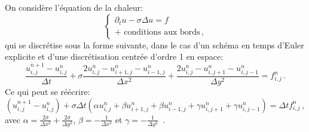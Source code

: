 \documentclass[11pt]{article}
\begin{document}
On considère l'équation de la chaleur: 
\begin{equation}
	\left\{
	\begin{array}{l}
		\partial_t u - \sigma \Delta u = f\\
		\textrm{+ conditions aux bords} \,,	
	\end{array}
	\right.
\label{eq:heat}
\end{equation}
qui se discrétise sous la forme suivante, dans le cas d'un schéma en temps d'Euler explicite et d'une discrétisation centrée d'ordre 1 en espace:
\begin{equation}
  \frac{u^{n+1}_{i,j}-u^{n}_{i,j}}{\Delta t} + \sigma \frac{2u^{n}_{i,j}-u^{n}_{i+1,j}-u^{n}_{i-1,j}}{\Delta x^2} + \frac{2u^{n}_{i,j} - u^{n}_{i,j+1} - u^{n}_{i,j-1}}{\Delta y^2} = f^{n}_{i,j} \,.
\label{eq:discrete}
\end{equation}
Ce qui peut se réécrire:
\begin{equation}
 (u^{n+1}_{i,j}-u^{n}_{i,j}) + \sigma\Delta t\left(\alpha u^{n}_{i,j} + \beta u^{n}_{i+1,j} +  \beta u^{n}_{i-1,j} + \gamma u^{n}_{i,j+1} +  \gamma u^{n}_{i,j-1}\right) = \Delta t f^{n}_{i,j} \,,
\label{eq:discrete2}
\end{equation}
avec $\alpha = \frac{2\sigma}{\Delta x^2} + \frac{2\sigma}{\Delta y^2}$, $\beta = -\frac{1}{\Delta x^2}$ et $\gamma = -\frac{1}{\Delta y^2}$ \,.

\bigskip
\end{document}
